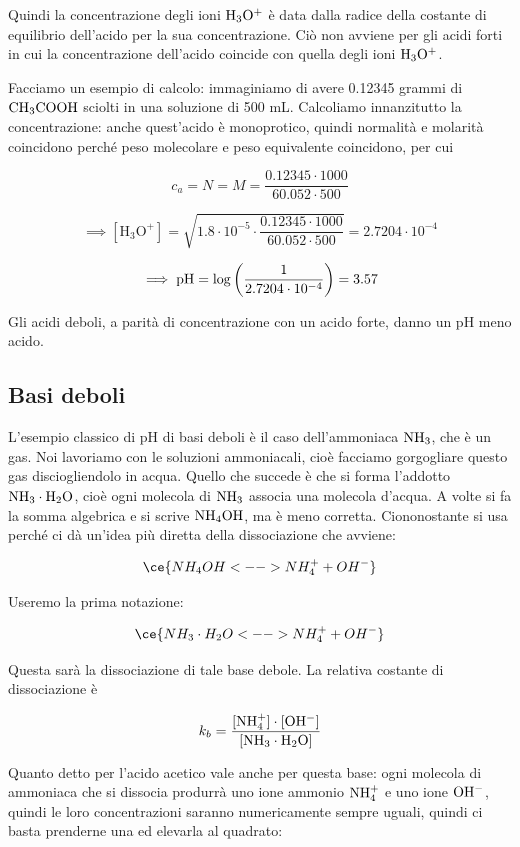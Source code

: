 Quindi la concentrazione degli ioni $\rm H_3O^+$ è data dalla radice della costante di equilibrio dell'acido per la sua concentrazione. Ciò non avviene per gli acidi forti in cui la concentrazione dell'acido coincide con quella degli ioni $\rm H_3O^+$.

Facciamo un esempio di calcolo: immaginiamo di avere 0.12345 grammi di $\rm CH_3COOH$ sciolti in una soluzione di 500 mL. Calcoliamo innanzitutto la concentrazione: anche quest'acido è monoprotico, quindi normalità e molarità coincidono perché peso molecolare e peso equivalente coincidono, per cui

$$c_a=N=M=\frac{0.12345 \cdot 1000}{60.052 \cdot 500}$$

$$\implies [\text{H}_3\text{O}^+]=\sqrt{1.8 \cdot 10^{-5} \cdot \frac{0.12345 \cdot 1000}{60.052 \cdot 500}}=2.7204 \cdot 10^{-4}$$

$$\implies \rm pH=\log \left( \frac{1}{2.7204 \cdot 10^{-4}} \right)=3.57$$

Gli acidi deboli, a parità di concentrazione con un acido forte, danno un pH meno acido. 

\subsection{Basi deboli}

L'esempio classico di pH di basi deboli è il caso dell'ammoniaca $\rm NH_3$, che è un gas. Noi lavoriamo con le soluzioni ammoniacali, cioè facciamo gorgogliare questo gas disciogliendolo in acqua. Quello che succede è che si forma l'addotto $\rm NH_3 \cdot H_2O$, cioè ogni molecola di $\rm NH_3$ associa una molecola d'acqua. A volte si fa la somma algebrica e si scrive $\rm NH_4OH$, ma è meno corretta. Ciononostante si usa perché ci dà un'idea più diretta della dissociazione che avviene:

$$\ce{NH_4OH <--> NH_4^+ + OH^-}$$

Useremo la prima notazione:

$$\ce{NH_3 \cdot H_2O <--> NH_4^+ + OH^-}$$

Questa sarà la dissociazione di tale base debole. La relativa costante di dissociazione è

$$k_b= \frac{\rm{[NH_4^+] \cdot [OH^-]}}{\rm{[NH_3 \cdot H_2O]}}$$

Quanto detto per l'acido acetico vale anche per questa base: ogni molecola di ammoniaca che si dissocia produrrà uno ione ammonio $\rm NH_4^+$ e uno ione $\rm OH^-$, quindi le loro concentrazioni saranno numericamente sempre uguali, quindi ci basta prenderne una ed elevarla al quadrato:

